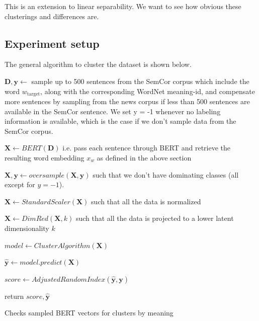 \documentclass[a4paper,12pt,twoside,openright]{report}
\begin{document}
This is an extension to linear separability.
We want to see how obvious these clusterings and differences are.


\subsection{Experiment setup}

The general algorithm to cluster the dataset is shown below.



\begin{algorithm}[H]
\SetAlgoLined
{}

 $\mathbf{D}, \mathbf{y} \leftarrow $  sample up to 500 sentences from the SemCor corpus which include the word $w_{\text{target}}$, along with the corresponding WordNet meaning-id, and compensate more sentences by sampling from the news corpus if less than 500 sentences are available in the SemCor sentence.
We set y = -1 whenever no labeling information is available, which is the case if we don't sample data from the SemCor corpus.\;

$ \mathbf{X} \leftarrow BERT( \mathbf{D} )$ i.e. pass each sentence through BERT and retrieve the resulting word embedding $x_w$ as defined in the above section\;
 
$ \mathbf{X}, \mathbf{y} \leftarrow oversample( \mathbf{X}, \mathbf{y} )$ such that we don't have dominating classes (all except for $y = -1$).\;
 
$ \mathbf{X} \leftarrow StandardScaler( \mathbf{X})$ such that all the data is normalized\;

$ \mathbf{X} \leftarrow DimRed( \mathbf{X}, k )$ such that all the data is projected to a lower latent dimensionality $k$\;

$ model \leftarrow ClusterAlgorithm( \mathbf{X})$ \;

$ \mathbf{\hat{y}} \leftarrow model.predict(\mathbf{X}) $ \;

$ score \leftarrow AdjustedRandomIndex(\mathbf{\hat{y}}, \mathbf{y}) $ \;

return $ score, \mathbf{\hat{y}}$\;
    
 \caption{Checks sampled BERT vectors for clusters by  meaning}
\end{algorithm}
\end{document}
